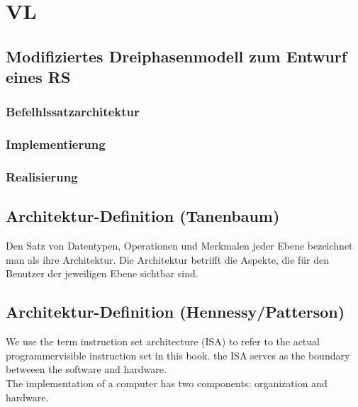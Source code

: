 \section{VL}
\subsection{Modifiziertes Dreiphasenmodell zum Entwurf eines RS}
\subsubsection{Befelhlssatzarchitektur}
\subsubsection{Implementierung}
\subsubsection{Realisierung}
\subsection{Architektur-Definition (Tanenbaum)}
Den Satz von Datentypen, Operationen und Merkmalen jeder Ebene bezeichnet man als ihre Architektur. Die Architektur betrifft die Aspekte, die für den Benutzer der jeweiligen Ebene sichtbar sind.
\subsection{Architektur-Definition (Hennessy/Patterson)}
We use the term instruction set architecture (ISA) to refer to the actual programmervisible instruction set in this book. the ISA serves as the boundary betweeen the software and hardware. \\ The implementation of a computer has two components: organization and hardware.
